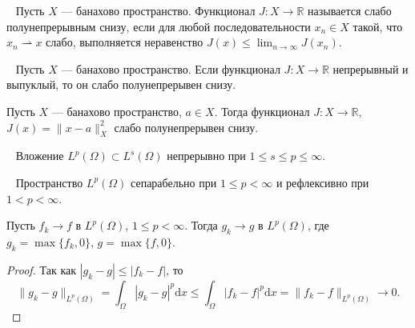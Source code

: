 \begin{definition}
    \label{def:weakly_semicontinuous}~\cite[с. 47]{Troeltzsch2010}
    Пусть $X$ — банахово пространство.
    Функционал $J : X \to \mathbb{R}$ называется слабо полунепрерывным
    снизу, если для любой последовательности $x_n \in X$ такой,
    что $x_n \rightharpoonup x$ слабо, выполняется неравенство
    $J(x) \leq \lim_{n \to \infty} J(x_n)$.
\end{definition}

\begin{lemma}
    \label{lem:weakly_semicontinuous_functional}~\cite[с. 47]{Troeltzsch2010}
    Пусть $X$ — банахово пространство.
    Если функционал $J : X \to \mathbb{R}$ непрерывный и выпуклый,
    то он слабо полунепрерывен снизу.
\end{lemma}

\begin{corollary}
    \label{cor:weakly_semicontinuous_norm}
    Пусть $X$ — банахово пространство, $a \in X$.
    Тогда функционал $J : X \to \mathbb{R}$, $J(x) = \|x - a\|^2_X$
    слабо полунепрерывен снизу.
\end{corollary}

\begin{lemma}
    \label{lem:embedding_Lp_Ls}~\cite[с. 37]{Zeidler1990a}
    Вложение $L^p(\Omega) \subset L^s(\Omega)$ непрерывно при
    $1 \leq s \leq p \leq \infty$.
\end{lemma}

\begin{lemma}
    \label{lem:Lp_separability_reflexivity}~\cite[с. 1020]{Zeidler1990b}
    Пространство $L^p(\Omega)$ сепарабельно при $1 \leq p < \infty$
    и рефлексивно при $1 < p < \infty$.
\end{lemma}

\begin{lemma}
    \label{lem:convergence_max_function}
    Пусть $f_k \to f$ в $L^p(\Omega)$, $1 \leq p < \infty$.
    Тогда $g_k \to g$ в $L^p(\Omega)$,
    где $g_k = \max\{f_k, 0\}$, $g = \max\{f, 0\}$.
\end{lemma}

\begin{proof}
    Так как $|g_k - g| \leq |f_k - f|$, то
    \begin{equation*}
        \|g_k - g\|_{L^p(\Omega)} =
        \int_{\Omega} |g_k - g|^p \mathrm{d}x
        \leq \int_{\Omega} |f_k - f|^p \mathrm{d}x =
        \|f_k - f\|_{L^p(\Omega)} \to 0.
    \end{equation*}
\end{proof}

